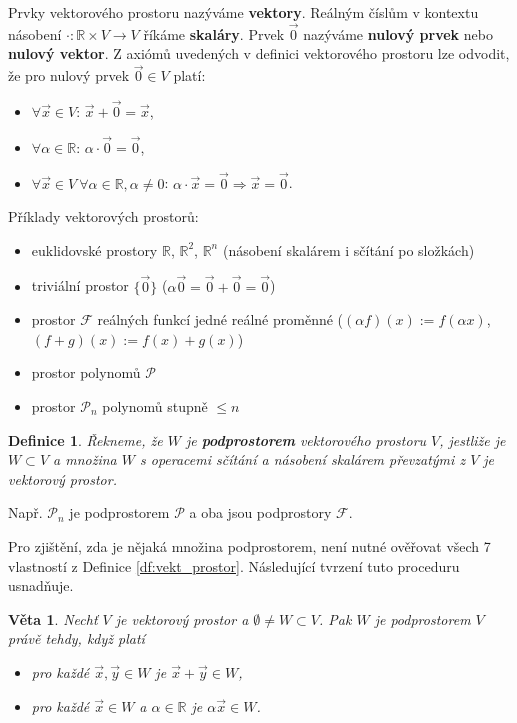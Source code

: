 \documentclass{article}
\newtheorem{df}{Definice}
\newtheorem{veta}{Věta}
\newcommand{\0}{\vec{0}}
\newcommand{\R}{\mathbb R}
\newcommand{\xx}{\vec{x}}
\newcommand{\yy}{\vec{y}}
\begin{document}
Prvky vektorového prostoru nazýváme {\bf vektory}.
Reálným číslům v kontextu násobení $\cdot:\R\times V\to V$ říkáme {\bf skaláry}.
Prvek $\0$ nazýváme {\bf nulový prvek} nebo {\bf nulový vektor}.
% 
Z axiómů uvedených v definici vektorového prostoru lze odvodit, že pro nulový prvek $\0\in V$ platí:
\begin{itemize}
\item $\forall\xx\in V$: $\xx+\0=\xx$,
\item $\forall\alpha\in\R$: $\alpha\cdot\0=\0$,
\item $\forall\xx\in V~\forall\alpha\in\R,\alpha\neq 0$: $\alpha\cdot\xx=\0\Rightarrow\xx=\0$.
\end{itemize}
% 
% 
Příklady vektorových prostorů:
\begin{itemize}
\item euklidovské prostory $\R$, $\R^2$, $\R^n$ (násobení skalárem i sčítání po složkách)
\item triviální prostor $\{\0\}$ ($\alpha\0=\0+\0=\0$)
\item prostor $\mathcal F$ reálných funkcí jedné reálné proměnné ($(\alpha f)(x):=f(\alpha x)$, $(f+g)(x):=f(x)+g(x)$)
\item prostor polynomů $\mathcal P$
\item prostor $\mathcal P_n$ polynomů stupně $\le n$
\end{itemize}

\begin{df}
Řekneme, že $W$ je {\bf podprostorem} vektorového prostoru $V$, jestliže je $W\subset V$ a množina $W$ s operacemi sčítání a násobení skalárem převzatými z $V$ je vektorový prostor.
\end{df}
Např. $\mathcal P_n$ je podprostorem $\mathcal P$ a oba jsou podprostory $\mathcal F$.

Pro zjištění, zda je nějaká množina podprostorem, není nutné ověřovat všech 7 vlastností z Definice \ref{df:vekt_prostor}.
Následující tvrzení tuto proceduru usnadňuje.
\begin{veta}
Nechť $V$ je vektorový prostor a $\emptyset\neq W\subset V$.
Pak $W$ je podprostorem $V$ právě tehdy, když platí
\begin{itemize}
\item[(i)] pro každé $\xx,\yy\in W$ je $\xx+\yy\in W$,
\item[(ii)] pro každé $\xx\in W$ a $\alpha\in\R$ je $\alpha\xx\in W$.
\end{itemize}
\end{veta}
\end{document}
